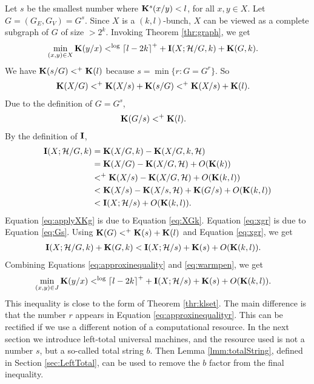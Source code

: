 \documentclass[11pt]{article}\textwidth 6.5in\textheight 9in
\begin{document}
Let $s$ be the smallest number where ${\mathbf K}^s(x/y)< l$, for all $x,y\in X$. Let $G=(G_E,G_V)=G^s$.  Since $X$ is a $(k,l)$-bunch, $X$ can be viewed as a complete subgraph of $G$ of size ${>}2^k$. Invoking Theorem \ref{thr:graph}, we get
\begin{align}
\label{eq:approxinequality}
\min_{(x,y)\in X}{\mathbf K}(y/x)&<^{\log} {\lceil l-2k\rceil}^++{\mathbf I}(X;\mathcal{H}/G,k)+{\mathbf K}(G,k).
\end{align}
We have ${\mathbf K}(s/G)<^+ {\mathbf K}(l)$ because $s=\min\{r:G=G^r\}$. So
\begin{align}
\label{eq:XGk}
{\mathbf K}(X/G)&<^+ {\mathbf K}(X/s)+{\mathbf K}(s/G)<^+ {\mathbf K}(X/s)+{\mathbf K}(l).
\end{align} 
Due to the definition of $G=G^s$,
\begin{align}
\label{eq:Gs}
{\mathbf K}(G/s)&<^+ {\mathbf K}(l).
\end{align}
 By the definition of ${\mathbf I}$,
\begin{align}
\nonumber
{\mathbf I}(X;\mathcal{H}/G,k)&={\mathbf K}(X/G,k)-{\mathbf K}(X/G,k,\mathcal{H})\\
\nonumber
&={\mathbf K}(X/G)-{\mathbf K}(X/G,\mathcal{H})+O({\mathbf K}(k))\\
\label{eq:applyXKg}
&<^+ {\mathbf K}(X/s)-{\mathbf K}(X/G,\mathcal{H})+O({\mathbf K}(k,l))\\
\nonumber
&< {\mathbf K}(X/s)-{\mathbf K}(X/s,\mathcal{H})+{\mathbf K}(G/s)+O({\mathbf K}(k,l))\\
\label{eq:xgr}
&< {\mathbf I}(X;\mathcal{H}/s)+O({\mathbf K}(k,l)).
\end{align}
Equation \ref{eq:applyXKg} is due to Equation \ref{eq:XGk}. Equation \ref{eq:xgr} is due to Equation \ref{eq:Gs}. Using ${\mathbf K}(G)<^+{\mathbf K}(s)+{\mathbf K}(l)$  and Equation \ref{eq:xgr}, we get
\begin{align}
\label{eq:warmpen}
{\mathbf I}(X;\mathcal{H}/G,k)+{\mathbf K}(G,k) &< {\mathbf I}(X;{\mathcal H}/s) +{\mathbf K}(s) + O({\mathbf K}(k,l)).
\end{align}
Combining Equations \ref{eq:approxinequality} and \ref{eq:warmpen},
we get 
\begin{align}
\label{eq:approxinequalityr}
\min_{(x,y)\in J}{\mathbf K}(y/x)&<^{\log} {\lceil l-2k\rceil}^++{\mathbf I}(X;\mathcal{H}/s)+{\mathbf K}(s)+O({\mathbf K}(k,l)).
\end{align}
This inequality is close to the form of Theorem \ref{thr:klset}. The main difference is that the number $r$ appears in Equation \ref{eq:approxinequalityr}. This can be rectified if we use a different notion of a computational resource. In the next section we introduce left-total universal machines, and the resource used is not a number $s$, but a so-called total string $b$. Then Lemma \ref{lmm:totalString}, defined in Section \ref{sec:LeftTotal}, can be used to remove the $b$ factor from the final inequality.
\end{document}
